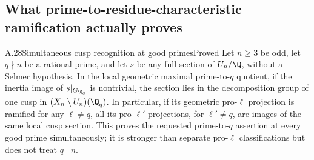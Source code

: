 \subsection{What prime-to-residue-characteristic ramification actually proves}

\begin{statement}{A.28}{Simultaneous cusp recognition at good primes}{Proved}
Let $n\ge3$ be odd, let $q\nmid n$ be a rational prime, and let $s$ be any full section of $U_n/\Q$, without a Selmer hypothesis. In the local geometric maximal prime-to-$q$ quotient, if the inertia image of $s|_{G_{\Q_q}}$ is nontrivial, the section lies in the decomposition group of one cusp in $(X_n\setminus U_n)(\Q_q)$. In particular, if its geometric pro-$\ell$ projection is ramified for any $\ell\ne q$, all its pro-$\ell'$ projections, for $\ell'\ne q$, are images of the same local cusp section. This proves the requested prime-to-$q$ assertion at every good prime simultaneously; it is stronger than separate pro-$\ell$ classifications but does not treat $q\mid n$.
\end{statement}
